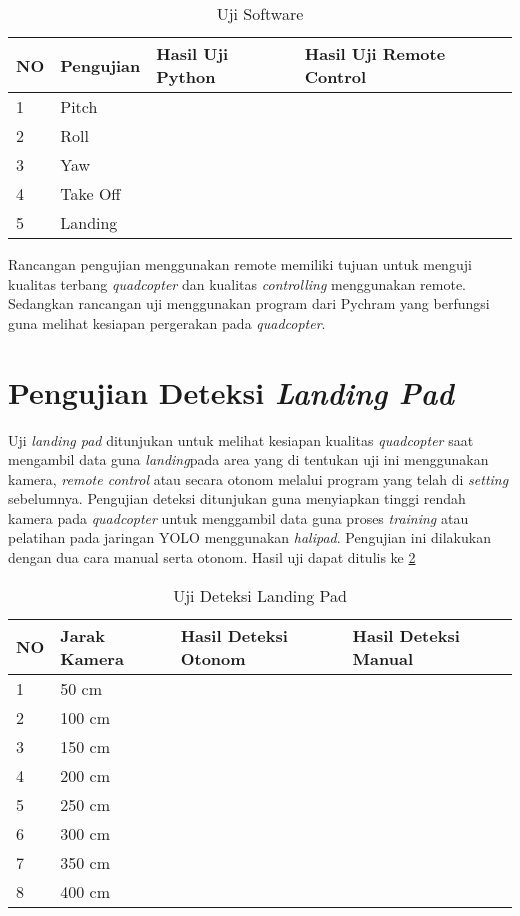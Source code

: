 \begin{table}[h]
	\caption{Uji Software}
	\label{tab:ujisof}
	\centering
	\begin{tabular}{|l|l|l|l|}
		\hline
		NO & Pengujian & Hasil Uji Python & Hasil Uji Remote Control \\ \hline
		1 & Pitch &  &  \\ \hline
		2 & Roll &  &  \\ \hline
		3 & Yaw &  &  \\ \hline
		4 & Take Off &  &  \\ \hline
		5 & Landing &  &  \\ \hline
	\end{tabular}
\end{table}

Rancangan pengujian menggunakan remote memiliki tujuan untuk menguji kualitas terbang \textit{quadcopter} dan kualitas \textit{controlling} menggunakan remote. Sedangkan rancangan uji menggunakan program dari Pychram yang berfungsi guna melihat kesiapan pergerakan pada \textit{quadcopter}.

\section{Pengujian Deteksi \textit{Landing Pad}}
	Uji \textit{landing pad} ditunjukan untuk melihat kesiapan kualitas \textit{quadcopter} saat mengambil data guna \textit{landing}pada area yang di tentukan uji ini menggunakan kamera, \textit{remote control} atau secara otonom melalui program yang telah di \textit{setting} sebelumnya. Pengujian deteksi ditunjukan guna menyiapkan tinggi rendah kamera pada \textit{quadcopter} untuk menggambil data guna proses \textit{training} atau pelatihan pada jaringan YOLO menggunakan \textit{halipad}. Pengujian ini dilakukan dengan dua cara manual serta otonom. Hasil uji dapat ditulis ke \cref{tab:ujidek}
	
	\begin{table}[h]
		\caption{Uji Deteksi Landing Pad}
		\label{tab:ujidek}
		\centering
		\begin{tabular}{|l|l|l|l|}
			\hline
			NO & Jarak Kamera & Hasil Deteksi Otonom & Hasil Deteksi Manual \\ \hline
			1 & 50 cm &  &  \\ \hline
			2 & 100 cm &  &  \\ \hline
			3 & 150 cm &  &  \\ \hline
			4 & 200 cm &  &  \\ \hline
			5 & 250 cm &  &  \\ \hline
			6 & 300 cm &  &  \\ \hline
			7 & 350 cm &  &  \\ \hline
			8 & 400 cm &  &  \\ \hline
		\end{tabular}
	\end{table}
